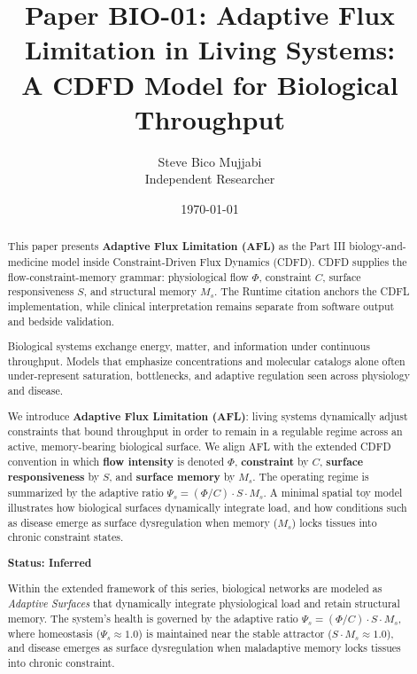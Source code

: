\documentclass[11pt]{article}
\title{\textbf{Paper BIO-01: Adaptive Flux Limitation in Living Systems:\\ A CDFD Model for Biological Throughput}}
\author{Steve Bico Mujjabi\\ \small Independent Researcher}
\date{\today}
\begin{document}
\maketitle

\begin{abstract}

This paper presents \textbf{Adaptive Flux Limitation (AFL)} as the Part III biology-and-medicine model inside Constraint-Driven Flux Dynamics (CDFD). CDFD supplies the flow-constraint-memory grammar: physiological flow $\Phi$, constraint $C$, surface responsiveness $S$, and structural memory $M_s$. The Runtime citation anchors the CDFL implementation, while clinical interpretation remains separate from software output and bedside validation.

Biological systems exchange energy, matter, and information under continuous throughput. Models that emphasize concentrations and molecular catalogs alone often under-represent saturation, bottlenecks, and adaptive regulation seen across physiology and disease.

We introduce \textbf{Adaptive Flux Limitation (AFL)}: living systems dynamically adjust constraints that bound throughput in order to remain in a regulable regime across an active, memory-bearing biological surface. We align AFL with the extended CDFD convention in which \textbf{flow intensity} is denoted $\Phi$, \textbf{constraint} by $C$, \textbf{surface responsiveness} by $S$, and \textbf{surface memory} by $M_s$. The operating regime is summarized by the adaptive ratio $\Psi_s=(\Phi/C) \cdot S \cdot M_s$. A minimal spatial toy model illustrates how biological surfaces dynamically integrate load, and how conditions such as disease emerge as surface dysregulation when memory ($M_s$) locks tissues into chronic constraint states.

\textbf{Status: Inferred}

\medskip
\noindent Within the extended framework of this series, biological networks are modeled as \emph{Adaptive Surfaces} that dynamically integrate physiological load and retain structural memory. The system's health is governed by the adaptive ratio $\Psi_s = (\Phi/C) \cdot S \cdot M_s$, where homeostasis ($\Psi_s \approx 1.0$) is maintained near the stable attractor ($S \cdot M_s \approx 1.0$), and disease emerges as surface dysregulation when maladaptive memory locks tissues into chronic constraint.

\end{abstract}
\end{document}
